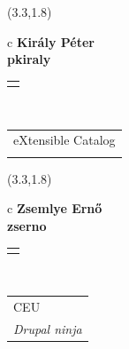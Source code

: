 \documentclass[11pt]{article}
\begin{document}
\makebox(3.3,1.8){
  \renewcommand\arraystretch{1.3}
  \begin{tabular}[c]{c}
    \hspace{8.5mm}
    \LARGE\bf{ Király Péter }\\
    \hspace{8.5mm}
    \Large{ pkiraly }\\
    \renewcommand\arraystretch{3}
    \begin{tabular}[c]{c}
      \centering
      \fontfamily{phv}\selectfont{
        \textbf{
          \textsc{
            \scriptsize{
            \color{Bright}{ Ismerkedő }\color{Bright}{ Webmester }\color{Bright}{ Sminkmester }\color{Dark}{ Programozó }
            }
          }
        }
      }
    \end{tabular}
    \\
    \renewcommand\arraystretch{1}
    \begin{tabular}{p{3.3in}}
      \hspace{.7cm}eXtensible Catalog\\
      \hspace{.7cm}\emph{  }\\
    \end{tabular}
  \end{tabular}
}

\makebox(3.3,1.8){
  \renewcommand\arraystretch{1.3}
  \begin{tabular}[c]{c}
    \hspace{8.5mm}
    \LARGE\bf{ Zsemlye Ernő }\\
    \hspace{8.5mm}
    \Large{ zserno }\\
    \renewcommand\arraystretch{3}
    \begin{tabular}[c]{c}
      \centering
      \fontfamily{phv}\selectfont{
        \textbf{
          \textsc{
            \scriptsize{
            \color{Bright}{ Ismerkedő }\color{Bright}{ Webmester }\color{Bright}{ Sminkmester }\color{Dark}{ Programozó }
            }
          }
        }
      }
    \end{tabular}
    \\
    \renewcommand\arraystretch{1}
    \begin{tabular}{p{3.3in}}
      \hspace{.7cm}CEU\\
      \hspace{.7cm}\emph{ Drupal ninja }\\
    \end{tabular}
  \end{tabular}
}
\end{document}

